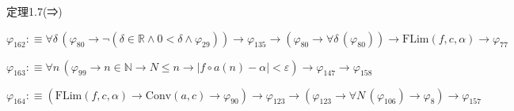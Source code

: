 \begin{fullproof}{定理1.7(⇒)}
\begin{abbrevlist}
\item $\varphi_{162} :\equiv \forall \delta\,(\varphi_{80} \to \neg (\delta \in \mathbb{R} \land 0 < \delta \land \varphi_{29})) \to \varphi_{135} \to (\varphi_{80} \to \forall \delta\,(\varphi_{80})) \to \mathrm{FLim}(f,c,\alpha) \to \varphi_{77}$
\item $\varphi_{163} :\equiv \forall n\,(\varphi_{99} \to n \in \mathbb{N} \to N \leq n \to \lvert f \circ a(n) - \alpha \rvert < \varepsilon) \to \varphi_{147} \to \varphi_{158}$
\item $\varphi_{164} :\equiv (\mathrm{FLim}(f,c,\alpha) \to \mathrm{Conv}(a,c) \to \varphi_{90}) \to \varphi_{123} \to (\varphi_{123} \to \forall N\,(\varphi_{106}) \to \varphi_{8}) \to \varphi_{157}$
\end{abbrevlist}
\end{fullproof}

